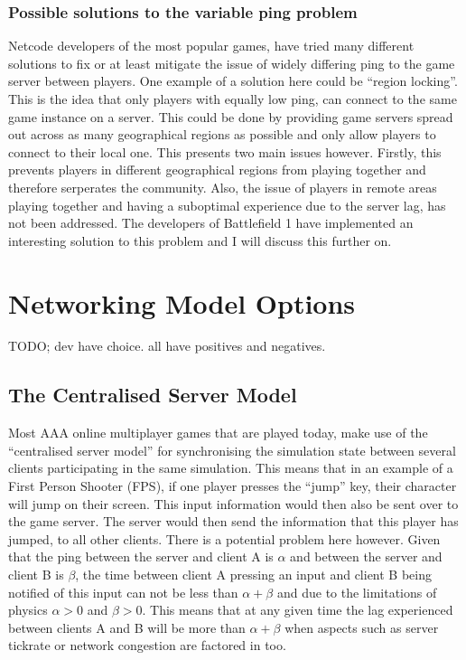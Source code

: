 \subsubsection{Possible solutions to the variable ping problem}
Netcode developers of the most popular games, have tried many different solutions to fix or at least mitigate the issue of widely differing ping to the game server between players. One example of a solution here could be ``region locking''. This is the idea that only players with equally low ping, can connect to the same game instance on a server. This could be done by providing game servers spread out across as many geographical regions as possible and only allow players to connect to their local one. This presents two main issues however. Firstly, this prevents players in different geographical regions from playing together and therefore serperates the community. Also, the issue of players in remote areas playing together and having a suboptimal experience due to the server lag, has not been addressed. The developers of Battlefield 1 have implemented an interesting solution to this problem and I will discuss this further on.


\newpage
\section{Networking Model Options}
TODO; dev have choice. all have positives and negatives.


\subsection{The Centralised Server Model}
Most AAA online multiplayer games that are played today, make use of the ``centralised server model'' for synchronising the simulation state between several clients participating in the same simulation. This means that in an example of a First Person Shooter (FPS), if one player presses the ``jump'' key, their character will jump on their screen. This input information would then also be sent over to the game server. The server would then send the information that this player has jumped, to all other clients. There is a potential problem here however. Given that the ping between the server and client A is \(\alpha\) and between the server and client B is \(\beta\), the time between client A pressing an input and client B being notified of this input can not be less than $\alpha+\beta$ and due to the limitations of physics $\alpha>0$ and $\beta>0$. This means that at any given time the lag experienced between clients A and B will be more than $\alpha+\beta$ when aspects such as server tickrate or network congestion are factored in too.

